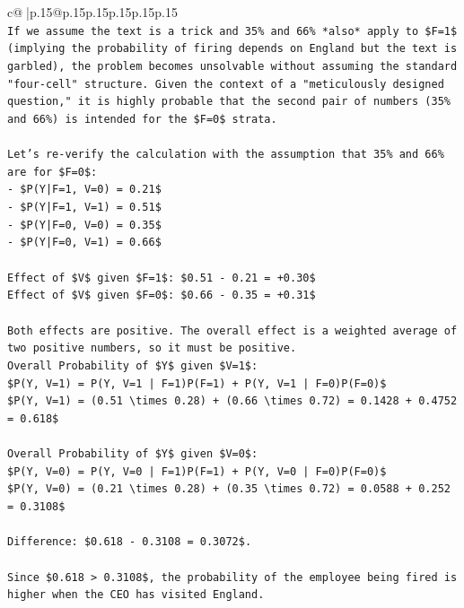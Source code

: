 \documentclass{article}
\begin{document}
{\begin{supertabular}{c@{$\;$}|p{.15\linewidth}@{}p{.15\linewidth}p{.15\linewidth}p{.15\linewidth}p{.15\linewidth}p{.15\linewidth}}
{{{\\ 
\texttt{If we assume the text is a trick and 35\% and 66\% *also* apply to \$F=1\$ (implying the probability of firing depends on England but the text is garbled), the problem becomes unsolvable without assuming the standard "four{-}cell" structure. Given the context of a "meticulously designed question," it is highly probable that the second pair of numbers (35\% and 66\%) is intended for the \$F=0\$ strata.} \\
\\ 
\texttt{Let's re{-}verify the calculation with the assumption that 35\% and 66\% are for \$F=0\$:} \\
\texttt{{-} \$P(Y|F=1, V=0) = 0.21\$} \\
\texttt{{-} \$P(Y|F=1, V=1) = 0.51\$} \\
\texttt{{-} \$P(Y|F=0, V=0) = 0.35\$} \\
\texttt{{-} \$P(Y|F=0, V=1) = 0.66\$} \\
\\ 
\texttt{Effect of \$V\$ given \$F=1\$: \$0.51 {-} 0.21 = +0.30\$} \\
\texttt{Effect of \$V\$ given \$F=0\$: \$0.66 {-} 0.35 = +0.31\$} \\
\\ 
\texttt{Both effects are positive. The overall effect is a weighted average of two positive numbers, so it must be positive.} \\
\texttt{Overall Probability of \$Y\$ given \$V=1\$:} \\
\texttt{\$P(Y, V=1) = P(Y, V=1 | F=1)P(F=1) + P(Y, V=1 | F=0)P(F=0)\$} \\
\texttt{\$P(Y, V=1) = (0.51 \textbackslash{}times 0.28) + (0.66 \textbackslash{}times 0.72) = 0.1428 + 0.4752 = 0.618\$} \\
\\ 
\texttt{Overall Probability of \$Y\$ given \$V=0\$:} \\
\texttt{\$P(Y, V=0) = P(Y, V=0 | F=1)P(F=1) + P(Y, V=0 | F=0)P(F=0)\$} \\
\texttt{\$P(Y, V=0) = (0.21 \textbackslash{}times 0.28) + (0.35 \textbackslash{}times 0.72) = 0.0588 + 0.252 = 0.3108\$} \\
\\ 
\texttt{Difference: \$0.618 {-} 0.3108 = 0.3072\$.} \\
\\ 
\texttt{Since \$0.618 > 0.3108\$, the probability of the employee being fired is higher when the CEO has visited England.} \\
}}}
\end{supertabular}}
\end{document}
